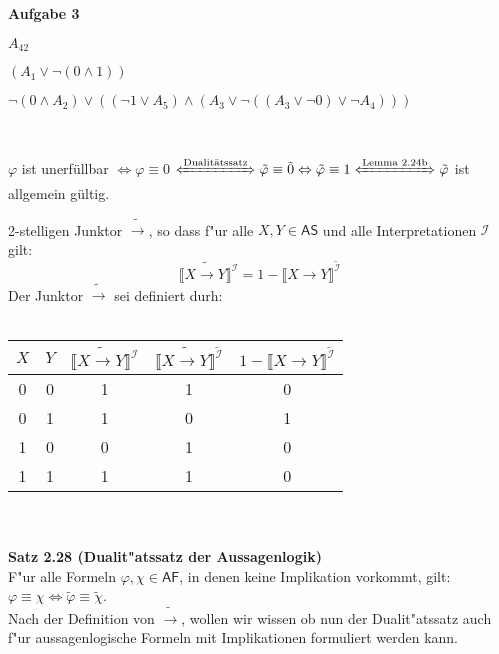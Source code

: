 \documentclass[a4paper,10pt]{article}
\begin{document}
	\newpage
	\textbf{Aufgabe 3}
	\begin{compactenum} [(a)]
		\item 
		\begin{compactenum} [(i)]
			\item $ A_{42} $
			\item $ (A_1 \vee \lnot (0 \wedge 1)) $
			\item $ \lnot (0 \wedge A_2) \vee ((\lnot 1 \vee A_5) \wedge (A_3 \vee \lnot ((A_3 \vee \lnot 0) \vee \lnot A_4))) $
		\end{compactenum}\ \\
		\item $ \varphi $ ist unerfüllbar $\Leftrightarrow \varphi \equiv 0$
		$ \xLeftrightarrow{\text{Dualitätssatz}} \tilde{\varphi} \equiv \tilde{0} \Leftrightarrow \tilde{\varphi} \equiv 1 \xLeftrightarrow{\text{Lemma 2.24b}} \tilde{\varphi} $ ist allgemein gültig.\\
		\item 2-stelligen Junktor $\tilde{\rightarrow}$, so dass f"ur alle $X, Y \in \mathsf{AS}$ und alle Interpretationen $\mathcal{I}$ gilt: \[\llbracket X \tilde{\rightarrow} Y \rrbracket^\mathcal{I} = 1 - \llbracket X \rightarrow Y \rrbracket^{\tilde{\mathcal{I}}} \]
		Der Junktor $\tilde{\rightarrow}$ sei definiert durh:\\\\
		\begin{tabular}{c|c|c|c|c}
			$X$ & $Y$ & $\llbracket X \tilde{\rightarrow} Y \rrbracket^\mathcal{I}$ & $\llbracket X \tilde{\rightarrow} Y \rrbracket^{\tilde{\mathcal{I}}}$ &  $1 - \llbracket X \rightarrow Y \rrbracket^{\tilde{\mathcal{I}}}$\\ 
			\hline 
			0 & 0 & 1 & 1 & 0 \\ 
			\hline 
			0 & 1 & 1 & 0 & 1 \\ 
			\hline 
			1 & 0 & 0 & 1 & 0 \\ 
			\hline 
			1 & 1 & 1 & 1 & 0 \\ 
		\end{tabular} \ \\\\
		\textbf{Satz 2.28 (Dualit"atssatz der Aussagenlogik)}\\
		F"ur alle Formeln $\varphi, \chi \in \mathsf{AF}$, in denen keine Implikation vorkommt, gilt: $\varphi \equiv \chi \Leftrightarrow \tilde{\varphi} \equiv \tilde{\chi}$.\\
		Nach der Definition von $\tilde{\rightarrow}$, wollen wir wissen ob nun der Dualit"atssatz auch f"ur aussagenlogische Formeln mit Implikationen formuliert werden kann. \\

\end{compactenum}
\end{document}

